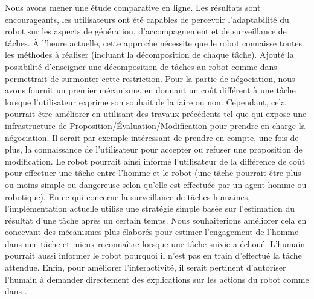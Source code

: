\documentclass[a4paper,11pt,twoside]{StyleThese}
\begin{document}
Nous avons mener une étude comparative en ligne. Les résultats sont encourageants, les utilisateurs ont été capables de percevoir l'adaptabilité du robot sur les aspects de génération, d'accompagnement et de surveillance de tâches.
%
À l'heure actuelle, cette approche nécessite que le robot connaisse toutes les méthodes à réaliser (incluant la décomposition de chaque tâche). Ajouté la possibilité d'enseigner une décomposition de tâches au robot comme dans  \cite{Mohseni2015} permettrait de surmonter cette restriction.
Pour la partie de négociation, nous avons fournit un premier mécanisme, en donnant un coût différent à une tâche lorsque l'utilisateur exprime son souhait de la faire ou non. Cependant, cela pourrait être améliorer en utilisant des travaux précédents tel que \cite{chu2000conflict} qui expose une infrastructure de Proposition/Évaluation/Modification pour prendre en charge la négociation.
Il serait par exemple intéressant de prendre en compte, une fois de plus, la connaissance de l'utilisateur pour accepter ou refuser une proposition de modification. Le robot pourrait ainsi informé l'utilisateur de la différence de coût pour effectuer une tâche entre l'homme et le robot (une tâche pourrait être plus ou moins simple ou dangereuse selon qu'elle est effectuée par un agent homme ou robotique).
En ce qui concerne la surveillance de tâches humaines, l'implémentation actuelle utilise une stratégie simple basée sur l'estimation du résultat d'une tâche après un certain temps. Nous souhaiterions améliorer cela en concevant des mécanismes plus élaborés pour estimer l'engagement de l'homme dans une tâche et mieux reconnaître lorsque une tâche suivie a échoué. L'humain pourrait aussi informer le robot pourquoi il n'est pas en train d'effectué la tâche attendue.
Enfin, pour améliorer l'interactivité, il serait pertinent d'autoriser l'humain à demander directement des explications sur les actions du robot comme dans  \cite{Lomas2012}.



\ifdefined{}
\else


\end{document}
